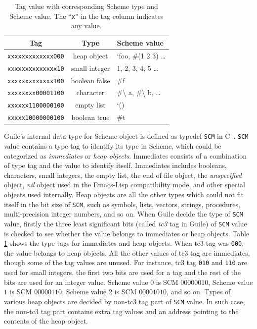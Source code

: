 \documentclass[preprint, 10pt]{sigplanconf}
\begin{document}
\begin{table}
  \begin{center}
  \begin{tabular}{ccl}
    Tag&Type&Scheme value\\
    \toprule
    \texttt{xxxxxxxxxxxxx000} & heap object & `foo, \#(1 2 3) \ldots \\
    \texttt{xxxxxxxxxxxxxx10} & small integer & 1, 2, 3, 4, 5 \ldots \\
    \texttt{xxxxxxxxxxxxx100} & boolean false & \#f \\
    \texttt{xxxxxxxx00001100} & character & \#\textbackslash{} a,
    \#\textbackslash{} b, \ldots \\
    \texttt{xxxxxx1100000100} & empty list & `() \\
    \texttt{xxxxx10000000100} & boolean true & \#t \\
  \end{tabular}
  \end{center}
  \caption{Tag value with corresponding Scheme type and Scheme value. The
    ``\texttt{x}'' in the tag column indicates any value.}
\label{tab:tags}
\end{table}

Guile's internal data type for Scheme object is defined as typedef
\texttt{SCM} in C~\cite{Galassi02guilereference}. \texttt{SCM} value contains
a type tag to identify its type in Scheme, which could be categorized as
\textit{immediates} or \textit{heap objects}. Immediates consists of a
combination of type tag and the value to identify itself. Immediates includes
booleans, characters, small integers, the empty list, the end of file object,
the \textit{unspecified} object, \textit{nil} object used in the Emacs-Lisp
compatibility mode, and other special objects used internally. Heap objects
are all the other types which could not fit itself in the bit size of
\texttt{SCM}, such as symbols, lists, vectors, strings, procedures,
multi-precision integer numbers, and so on.  When Guile decide the type of
\texttt{SCM} value, firstly the three least significant bits (called
\textit{tc3} tag in Guile) of \texttt{SCM} value is checked to see whether the
value belongs to immediates or heap objects. Table
\hyperref[tab:tags]{\ref{tab:tags}} shows the type tags for immediates and
heap objects. When tc3 tag was \texttt{000}, the value belongs to heap
objects. All the other values of tc3 tag are immediates, though some of the
tag values are unused. For instance, tc3 tag \texttt{010} and \texttt{110} are
used for small integers, the first two bits are used for a tag and the rest of
the bits are used for an integer value. Scheme value $0$ is SCM $00000010$,
Scheme value $1$ is SCM $00000110$, Scheme value 2 is SCM $00001010$, and so
on. Types of various heap objects are decided by non-tc3 tag part of
\texttt{SCM} value. In such case, the non-tc3 tag part contains extra tag
values and an address pointing to the contents of the heap object.
\end{document}
